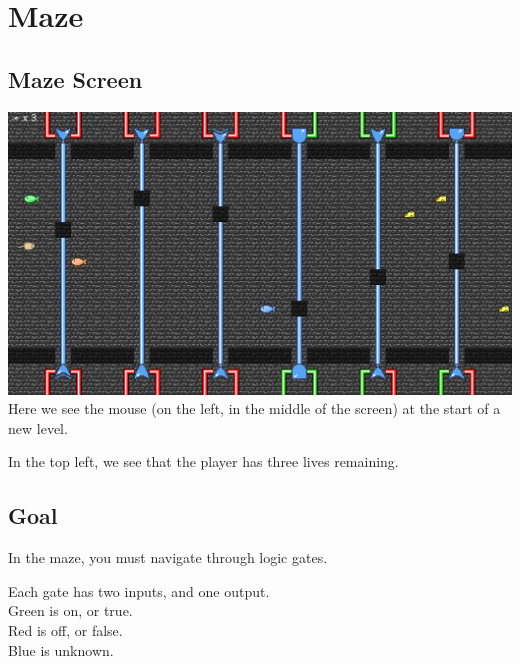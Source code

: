 \documentclass[12pt]{book}
\begin{document}
	\chapter{Maze}
		\section{Maze Screen}
			\includegraphics[width=\textwidth]{MazeScreenshot}
			\\
			Here we see the mouse (on the left, in the middle of the screen) at the start of a new level.

			In the top left, we see that the player has three lives remaining.
		\section{Goal}
			In the maze, you must navigate through logic gates.

			Each gate has two inputs, and one output.
			\\
			\textcolor{on}{Green is on, or true.}
			\\
			\textcolor{off}{Red is off, or false.}
			\\
			\textcolor{unknown}{Blue is unknown.}
\end{document}
